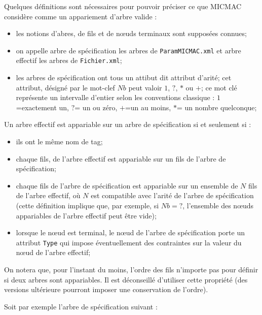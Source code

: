Quelques d\'efinitions sont n\'ecessaires pour pouvoir pr\'eciser 
ce que MICMAC consid\`ere comme un appariement d'arbre valide :

\begin{itemize}
   \item les notions d'abres, de fils et de n\oe{}uds terminaux sont suppos\'ees
         connues;
   \item  on appelle arbre de sp\'ecification les arbres de 
          {\tt ParamMICMAC.xml}  et arbre effectif les arbres de  
          {\tt Fichier.xml};
   \item les arbres de sp\'ecification ont tous un attibut dit attribut d'arit\'e;
         cet attribut, d\'esign\'e par le mot-clef $Nb$ peut valoir $1$,
         $?$, $*$ ou $+$; ce mot cl\'e repr\'esente un intervalle d'entier
         selon les conventions classique : $1$=exactement un, $?$= un ou z\'ero,
         $+$=un au moins, $*$= un nombre quelconque;
    
\end{itemize}

Un arbre effectif est appariable sur un arbre de sp\'ecification si et
seulement si :

\begin{itemize}
   \item ils ont le m\^eme nom de tag;
   \item chaque fils, de l'arbre effectif est appariable sur un  fils de l'arbre
         de sp\'ecification;
   \item chaque fils de l'arbre de sp\'ecification est appariable
         sur un ensemble de $N$ fils de l'arbre
         effectif,  o\`u $N$ est compatible avec l'arit\'e de l'arbre de sp\'ecification
         (cette d\'efinition implique que, par exemple, si $Nb=?$, l'ensemble des
           n\oe{}uds  appariables de l'arbre effectif peut \^etre vide);
   \item  lorsque le  n\oe{}ud est terminal, le  n\oe{}ud de l'arbre de sp\'ecification
          porte un attribut {\tt Type} qui impose \'eventuellement des contraintes sur
          la valeur du n\oe{}ud  de l'arbre effectif;
\end{itemize}

On notera que, pour l'instant du moins, l'ordre des fils n'importe
pas pour d\'efinir si deux arbres sont appariables.  Il est 
d\'econseill\'e d'utiliser cette propri\'et\'e (des versions 
ult\'erieure pourront imposer une conservation de l'ordre).

Soit par exemple l'arbre de sp\'ecification suivant :

